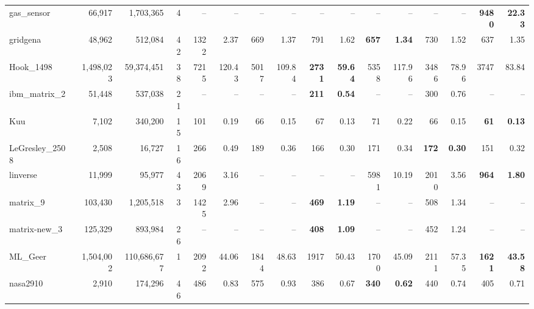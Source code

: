 \begin{landscape}
\begin{table}
\begin{tabular}{lrrr||rr|rr|rr|rr|rr|rr}
	          gas\_sensor	&	66,917	&	1,703,365	&	4  &      --  &      --   &      --  &      --   &      --  &      --   &      --  &      --   &      --  &      --   & \textbf{    9480} & \textbf{   22.33}\\
	            gridgena	&	48,962	&	512,084	&	42  &     1322 &     2.37  &      669 &     1.37  &      791 &     1.62  & \textbf{     657} & \textbf{    1.34}  &      730 &     1.52  &      637 &     1.35\\
	           Hook\_1498	&	1,498,023	&	59,374,451	&	38  &     7215 &   120.43  &     5017 &   109.84  & \textbf{    2731} & \textbf{   59.64}  &     5358 &   117.96  &     3486 &    78.96  &     3747 &    83.84\\
	        ibm\_matrix\_2	&	51,448	&	537,038	&	21  &      --  &      --   &      --  &      --   & \textbf{     211} & \textbf{    0.54}  &      --  &      --   &      300 &     0.76  &      --  &      -- \\
	                 Kuu	&	7,102	&	340,200	&	15  &      101 &     0.19  &       66 &     0.15  &       67 &     0.13  &       71 &     0.22  &       66 &     0.15  & \textbf{      61} & \textbf{    0.13}\\
	      LeGresley\_2508	&	2,508	&	16,727	&	16  &      266 &     0.49  &      189 &     0.36  &      166 &     0.30  &      171 &     0.34  & \textbf{     172} & \textbf{    0.30}  &      151 &     0.32\\
	            linverse	&	11,999	&	95,977	&	43  &     2069 &     3.16  &      --  &      --   &      --  &      --   &     5981 &    10.19  &     2010 &     3.56  & \textbf{     964} & \textbf{    1.80}\\
	            matrix\_9	&	103,430	&	1,205,518	&	3  &     1425 &     2.96  &      --  &      --   & \textbf{     469} & \textbf{    1.19}  &      --  &      --   &      508 &     1.34  &      --  &      -- \\
	        matrix-new\_3	&	125,329	&	893,984	&	26  &      --  &      --   &      --  &      --   & \textbf{     408} & \textbf{    1.09}  &      --  &      --   &      452 &     1.24  &      --  &      -- \\
	             ML\_Geer	&	1,504,002	&	110,686,677	&	1  &     2092 &    44.06  &     1844 &    48.63  &     1917 &    50.43  &     1700 &    45.09  &     2111 &    57.35  & \textbf{    1621} & \textbf{   43.58}\\
	            nasa2910	&	2,910	&	174,296	&	46  &      486 &     0.83  &      575 &     0.93  &      386 &     0.67  & \textbf{     340} & \textbf{    0.62}  &      440 &     0.74  &      405 &     0.71\\

\end{tabular}
\end{table}
\end{landscape}
